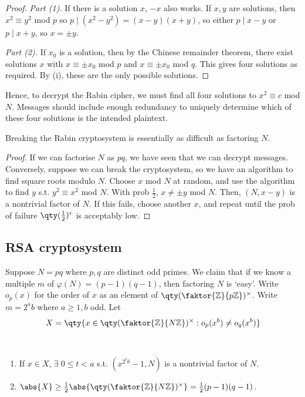 \begin{proof}
    \emph{Part (1).}
    If there is a solution $x$, $-x$ also works.
    If $x, y$ are solutions, then $x^2 \equiv y^2$ mod $p$ so $p \mid (x^2 - y^2) = (x-y)(x+y)$, so either $p \mid x-y$ or $p \mid x+y$, so $x = \pm y$.

    \emph{Part (2).}
    If $x_0$ is a solution, then by the Chinese remainder theorem, there exist solutions $x$ with $x \equiv \pm x_0$ mod $p$ and $x \equiv \pm x_0$ mod $q$.
    This gives four solutions as required.
    By (i), these are the only possible solutions.
\end{proof}

Hence, to decrypt the Rabin cipher, we must find all four solutions to $x^2 \equiv c$ mod $N$.
Messages should include enough redundancy to uniquely determine which of these four solutions is the intended plaintext.

\begin{theorem}
    Breaking the Rabin cryptosystem is essentially as difficult as factoring $N$.
\end{theorem}

\begin{proof}
    If we can factorise $N$ as $pq$, we have seen that we can decrypt messages.
    Conversely, suppose we can break the cryptosystem, so we have an algorithm to find square roots modulo $N$.
    Choose $x$ mod $N$ at random, and use the algorithm to find $y$ s.t. $y^2 \equiv x^2$ mod $N$.
    With prob $\frac{1}{2}$, $x \neq \pm y$ mod $N$.
    Then, $(N, x-y)$ is a nontrivial factor of $N$.
    If this fails, choose another $x$, and repeat until the prob of failure $\qty(\frac{1}{2})^r$ is acceptably low.
\end{proof}

\subsection{RSA cryptosystem}
Suppose $N = pq$ where $p, q$ are distinct odd primes.
We claim that if we know a multiple $m$ of $\varphi(N) = (p-1)(q-1)$, then factoring $N$ is `easy'.
Write $o_p(x)$ for the order of $x$ as an element of $\qty(\faktor{\mathbb Z}{p\mathbb Z})^\times$.
Write $m = 2^a b$ where $a \geq 1, b$ odd.
Let
\begin{align*}
    X = \qty{x \in \qty(\faktor{\mathbb Z}{N\mathbb Z})^\times : o_p(x^b) \neq o_q(x^b)}
\end{align*}

\begin{theorem} ~\vspace*{-1.5\baselineskip}
    \begin{enumerate}
        \item If $x \in X$, $\exists \; 0 \leq t < a$ s.t. $(x^{2^t b} - 1, N)$ is a nontrivial factor of $N$.
        \item $\abs{X} \geq \frac{1}{2} \abs{\qty(\faktor{\mathbb Z}{N\mathbb Z})^\times} = \frac{1}{2}(p-1)(q-1)$.
    \end{enumerate}
\end{theorem}

